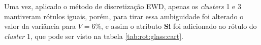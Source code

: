 Uma vez, aplicado o método de discretização EWD, apenas os \textit{clusters} 1 e 3 mantiveram rótulos iguais, porém, para tirar essa ambiguidade foi alterado o valor da variância para ${V=6\%}$, e assim o atributo \textbf{Si} foi adicionado ao rótulo do \textit{cluster} 1, que pode ser visto na tabela \ref{tab:rot:glass:cart}.







